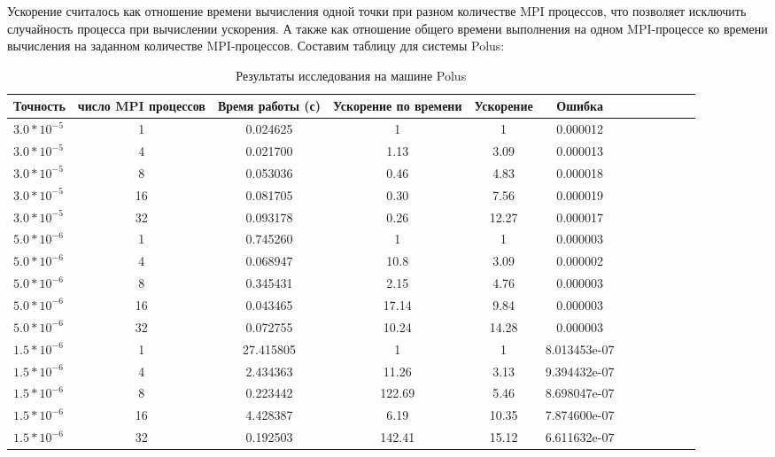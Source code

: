 \documentclass{article}
\begin{document}
    Ускорение считалось как отношение времени вычисления одной точки при разном 
    количестве MPI процессов, что позволяет исключить случайность процесса при вычислении ускорения.
    А также как отношение общего времени выполнения на одном MPI-процессе ко времени вычисления на заданном количестве MPI-процессов.
    Составим таблицу для системы Polus:
    \begin{table}[!t]
        \centering
        \caption{Результаты исследования на машине Polus}\label{tab:tab1}
        \begin{tabularx}{\textwidth}{@{}l*{10}{C}c@{}} %
            \toprule
            \bf Точность & \bf число MPI процессов  & \bf Время работы (с) & \bf Ускорение по времени & \bf Ускорение & \bf Ошибка \\
                \midrule
                \(3.0 * 10^{-5}\) & 1  & 0.024625 & 1    & 1     & 0.000012\\
                \(3.0 * 10^{-5}\) & 4  & 0.021700 & 1.13 & 3.09  & 0.000013\\
                \(3.0 * 10^{-5}\) & 8  & 0.053036 & 0.46 & 4.83  & 0.000018\\
                \(3.0 * 10^{-5}\) & 16 & 0.081705 & 0.30 & 7.56  & 0.000019\\
                \(3.0 * 10^{-5}\) & 32 & 0.093178 & 0.26 &12.27 & 0.000017\\
                \midrule
                \(5.0 * 10^{-6}\) & 1  & 0.745260 & 1     & 1     & 0.000003 \\
                \(5.0 * 10^{-6}\) & 4  & 0.068947 & 10.8  & 3.09  & 0.000002 \\
                \(5.0 * 10^{-6}\) & 8  & 0.345431 & 2.15  & 4.76  & 0.000003 \\
                \(5.0 * 10^{-6}\) & 16 & 0.043465 & 17.14 & 9.84  & 0.000003 \\
                \(5.0 * 10^{-6}\) & 32 & 0.072755 & 10.24 & 14.28 & 0.000003 \\
                \midrule
                \(1.5 * 10^{-6}\) & 1  & 27.415805 & 1      & 1     & 8.013453e-07 \\
                \(1.5 * 10^{-6}\) & 4  &  2.434363 & 11.26  & 3.13  & 9.394432e-07 \\
                \(1.5 * 10^{-6}\) & 8  &  0.223442 & 122.69 & 5.46  & 8.698047e-07 \\
                \(1.5 * 10^{-6}\) & 16 &  4.428387 & 6.19   & 10.35 & 7.874600e-07 \\
                \(1.5 * 10^{-6}\) & 32 &  0.192503 & 142.41 & 15.12 & 6.611632e-07 \\
                \bottomrule
            \end{tabularx}
        \end{table}
\end{document}
